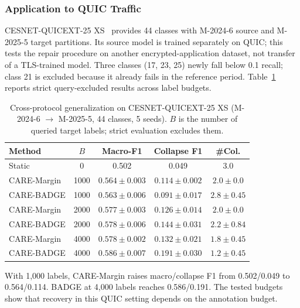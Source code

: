 \documentclass[journal]{IEEEtran}
\newcommand{\ours}{CARE}  %
\begin{document}
\subsubsection{Application to QUIC Traffic}
\label{sec:cross_protocol}

\label{sec:quicext25}

CESNET-QUICEXT-25 XS~\cite{cesnetquicext25,mucke2025waiting} provides 44 classes with M-2024-6 source and M-2025-5 target partitions. Its source model is trained separately on QUIC; this tests the repair procedure on another encrypted-application dataset, not transfer of a TLS-trained model. Three classes (17, 23, 25) newly fall below 0.1 recall; class 21 is excluded because it already fails in the reference period. Table~\ref{tab:quicext25} reports strict query-excluded results across label budgets.

\begin{table}[!htbp]
\centering
\caption{Cross-protocol generalization on CESNET-QUICEXT-25 XS (M-2024-6 $\to$ M-2025-5, 44 classes, 5 seeds). $B$ is the number of queried target labels; strict evaluation excludes them.}
\label{tab:quicext25}
\scriptsize
\setlength{\tabcolsep}{3pt}
\begin{tabular}{@{}l c c c c@{}}
\toprule
Method & $B$ & Macro-F1 & Collapse F1 & \#Col. \\
\midrule
Static & 0 & 0.502 & 0.049 & 3.0 \\
\ours{}-Margin & 1000 & $0.564{\pm}0.003$ & $0.114{\pm}0.002$ & $2.0{\pm}0.0$ \\
\ours{}-BADGE & 1000 & $0.563{\pm}0.006$ & $0.091{\pm}0.017$ & $2.8{\pm}0.45$ \\
\ours{}-Margin & 2000 & $0.577{\pm}0.003$ & $0.126{\pm}0.014$ & $2.0{\pm}0.0$ \\
\ours{}-BADGE & 2000 & $0.578{\pm}0.006$ & $0.144{\pm}0.031$ & $2.2{\pm}0.84$ \\
\ours{}-Margin & 4000 & $0.578{\pm}0.002$ & $0.132{\pm}0.021$ & $1.8{\pm}0.45$ \\
\ours{}-BADGE & 4000 & $\mathbf{0.586{\pm}0.007}$ & $\mathbf{0.191{\pm}0.030}$ & $\mathbf{1.2{\pm}0.45}$ \\
\bottomrule
\end{tabular}
\end{table}


With 1{,}000 labels, CARE-Margin raises macro/collapse F1 from 0.502/0.049 to 0.564/0.114. BADGE at 4{,}000 labels reaches 0.586/0.191. The tested budgets show that recovery in this QUIC setting depends on the annotation budget.
\end{document}
